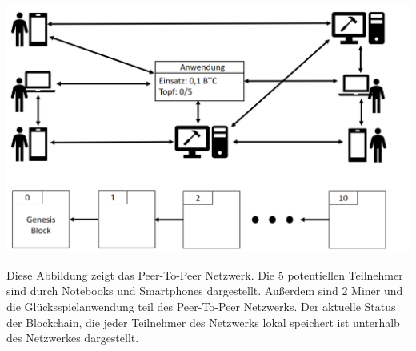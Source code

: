\vspace{1cm}
\begin{minipage}{0.55\textwidth}
\includegraphics[width=\textwidth]{Figures/konzept_btc/konzept1}
\centering
\decoRule
{}
\label{fig:konzept1}
\end{minipage}
\begin{minipage}{0.45\textwidth}
Diese Abbildung zeigt das Peer-To-Peer Netzwerk. Die 5 potentiellen Teilnehmer sind durch Notebooks und Smartphones dargestellt. Außerdem sind 2 Miner und die Glücksspielanwendung teil des Peer-To-Peer Netzwerks. Der aktuelle Status der Blockchain, die jeder Teilnehmer des Netzwerks lokal speichert ist unterhalb des Netzwerkes dargestellt.
\end{minipage}


